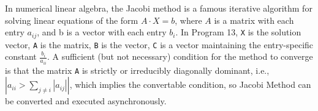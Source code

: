 \begin{appendix}
 In numerical linear algebra, the Jacobi method is a famous iterative algorithm for solving linear equations of the form $A\cdot X=b$, where $A$ is a matrix with each entry $a_{ij}$, and b is a vector with each entry $b_i$. In Program 13, \texttt{X} is the solution vector, \texttt{A} is the matrix, \texttt{B} is the vector, \texttt{C} is a vector maintaining the entry-specific constant $\frac{b_i}{a_{ii}}$. A sufficient (but not necessary) condition for the method to converge is that the matrix \texttt{A} is strictly or irreducibly diagonally dominant, i.e., $|a_{ii}>\sum_{j\neq i}{|a_{ij}|}|$, which implies the convertable condition, so Jacobi Method can be converted and executed asynchronously.
 
  

\end{appendix}
